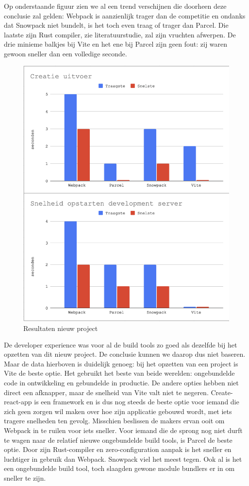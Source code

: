 Op onderstaande figuur zien we al een trend verschijnen die doorheen deze conclusie zal gelden: Webpack is aanzienlijk trager dan de competitie en ondanks dat Snowpack niet bundelt, is het toch even traag of trager dan Parcel. Die laatste zijn Rust compiler, zie literatuurstudie, zal zijn vruchten afwerpen. De drie minieme balkjes bij Vite en het ene bij Parcel zijn geen fout: zij waren gewoon sneller dan een volledige seconde.

\begin{figure}[h]
   \includegraphics[scale=0.5]{conclusieNieuw}
       \centering
       \caption{Resultaten nieuw project}
   \end{figure}


De developer experience was voor al de build tools zo goed als dezelfde bij het opzetten van dit nieuw project. De conclusie kunnen we daarop dus niet baseren. Maar de data hierboven is duidelijk genoeg: bij het opzetten van een project is Vite de beste optie. Het gebruikt het beste van beide werelden: ongebundelde code in ontwikkeling en gebundelde in productie. De andere opties hebben niet direct een afknapper, maar de snelheid van Vite valt niet te negeren. Create-react-app is een framework en is dus nog steeds de beste optie voor iemand die zich geen zorgen wil maken over hoe zijn applicatie gebouwd wordt, met iets tragere snelheden ten gevolg. Misschien beslissen de makers ervan ooit om Webpack in te ruilen voor iets sneller. Voor iemand die de sprong nog niet durft te wagen naar de relatief nieuwe ongebundelde build tools, is Parcel de beste optie. Door zijn Rust-compiler en zero-configuration aanpak is het sneller en luchtiger in gebruik dan Webpack. Snowpack viel het meest tegen. Ook al is het een ongebundelde build tool, toch slaagden gewone module bundlers er in om sneller te zijn. 
